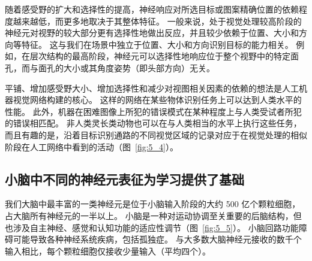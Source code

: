 随着感受野的扩大和选择性的提高，神经响应对所选目标或图案精确位置的依赖程度越来越低，而更多地取决于其整体特征。
一般来说，处于视觉处理较高阶段的神经元对视野的较大部分更有选择性地做出反应，并且较少依赖于位置、大小和方向等特征。
这与我们在场景中独立于位置、大小和方向识别目标的能力相关。
例如，在层次结构的最高阶段，神经元可以选择性地响应位于整个视野中的特定面孔，而与面孔的大小或其角度姿势（即头部方向）无关。


平铺、增加感受野大小、增加选择性和减少对视图相关因素的依赖的想法是人工机器视觉网络构建的核心。
这样的网络在某些物体识别任务上可以达到人类水平的性能。
此外，机器在困难图像上所犯的错误模式在某种程度上与人类受试者所犯的错误相匹配。
非人类灵长类动物也可以在与人类相当的水平上执行这些任务，而且有趣的是，沿着目标识别通路的不同视觉区域的记录对应于在视觉处理的相似阶段在人工网络中看到的活动（图~\ref{fig:5_4}）。



\subsection{小脑中不同的神经元表征为学习提供了基础}

我们大脑中最丰富的一类神经元是位于小脑输入阶段的大约 500 亿个颗粒细胞，占大脑所有神经元的一半以上。 
小脑是一种对运动协调至关重要的后脑结构，但也涉及自主神经、感觉和认知功能的适应性调节（图~\ref{fig:5_5}）。
小脑回路功能障碍可能导致各种神经系统疾病，包括孤独症。
与大多数大脑神经元接收的数千个输入相比，每个颗粒细胞仅接收少量输入（平均四个）。



